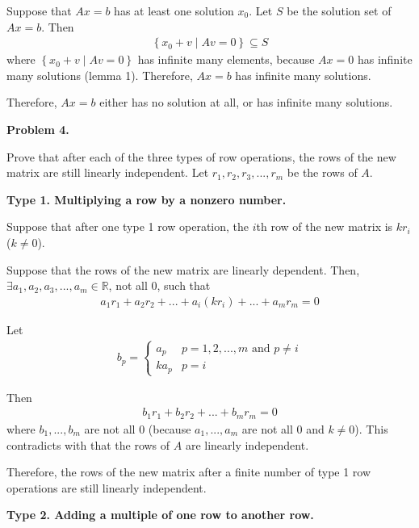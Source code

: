 \documentclass[12pt]{article}
\begin{document}
\vspace{\baselineskip}
Suppose that $Ax=b$ has at least one solution $x_0$. Let $S$ be the solution set of $Ax=b$. Then
\begin{gather*}
    \left\{x_0+v \;|\; Av=0 \right\} \subseteq S
\end{gather*}
where $\left\{x_0+v \;|\; Av=0 \right\}$ has infinite many elements, because $Ax=0$ has infinite many solutions (lemma 1). Therefore, $Ax=b$ has infinite many solutions.

Therefore, $Ax=b$ either has no solution at all, or has infinite many solutions.

\vspace{\baselineskip}
\noindent
\textbf{Problem 4.}

Prove that after each of the three types of row operations, the rows of the new matrix are still linearly independent. Let $r_1, r_2, r_3, ... , r_m$ be the rows of $A$. 

\vspace{\baselineskip}
\textbf{Type 1. Multiplying a row by a nonzero number.}

Suppose that after one type 1 row operation, the $i$th row of the new matrix is $kr_i$ ($k\ne 0$). 

Suppose that the rows of the new matrix are linearly dependent. Then, $\exists a_1, a_2, a_3, ... , a_m \in \mathbb{R}$, not all 0, such that
\begin{gather*}
    a_1r_1 + a_2r_2 + ... + a_i(kr_i) + ... + a_mr_m = 0
\end{gather*}

Let
\begin{align*}
    b_p=
    \begin{cases}
    a_p & p=1,2, ... ,m \text{~and~} p \ne i \\
    ka_p& p = i
    \end{cases}
\end{align*}

Then
\begin{gather*}
    b_1r_1 + b_2r_2 + ... + b_mr_m = 0
\end{gather*}
where $b_1, ... ,b_m$ are not all 0 (because $a_1, ... , a_m$ are not all 0 and $k\ne 0$). This contradicts with that the rows of $A$ are linearly independent.

Therefore, the rows of the new matrix after a finite number of type 1 row operations are still linearly independent.

\vspace{\baselineskip}
\textbf{Type 2. Adding a multiple of one row to another row.}
\end{document}
